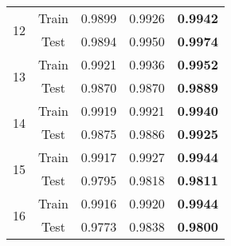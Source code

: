 \documentclass[11pt]{article}
\numberwithin{equation}{section}
\theoremstyle{plain}
\theoremstyle{definition}
\begin{document}
\begin{table}[htb!]
{\begin{tabular}{ccccc}
\multirow{2}{*}{12}      & Train                & 0.9899                                & 0.9926  & \textbf{0.9942}                                 \\
                         & Test                 & 0.9894                                & 0.9950     & \textbf{0.9974}                              \\\midrule
\multirow{2}{*}{13}      & Train                & 0.9921                                & 0.9936  & \textbf{0.9952}                                 \\
                         & Test                 & 0.9870                                & 0.9870   & \textbf{0.9889}                                \\\midrule
\multirow{2}{*}{14}      & Train                & 0.9919                                & 0.9921    & \textbf{0.9940}                               \\
                         & Test                 & 0.9875                                & 0.9886   & \textbf{0.9925}                                \\\midrule
\multirow{2}{*}{15}      & Train                & 0.9917                                & 0.9927       & \textbf{0.9944}                            \\
                         & Test                 & 0.9795                                & 0.9818    & \textbf{0.9811}                               \\\midrule
\multirow{2}{*}{16}      & Train                & 0.9916                                & 0.9920    & \textbf{0.9944}                               \\
                         & Test                 & 0.9773                                & 0.9838   & \textbf{0.9800}  \\\bottomrule                             
\end{tabular}}
\end{table}





\clearpage
\end{document}
